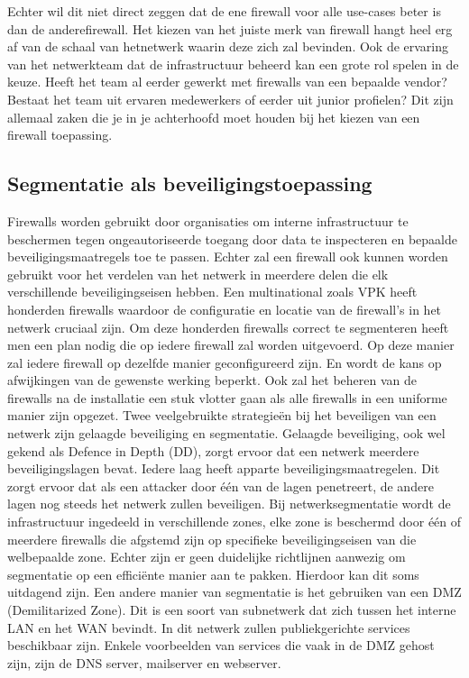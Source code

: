 Echter wil dit niet direct zeggen dat de ene firewall voor alle use-cases beter is dan de anderefirewall. Het kiezen van het juiste merk van firewall hangt heel erg af van de schaal van hetnetwerk waarin deze zich zal bevinden. Ook de ervaring van het netwerkteam dat de infrastructuur beheerd kan een grote rol spelen in de keuze. Heeft het team al eerder gewerkt met firewalls van een bepaalde vendor? Bestaat het team uit ervaren medewerkers of eerder uit junior profielen? Dit zijn allemaal zaken die je in je achterhoofd moet houden bij het kiezen van een firewall toepassing.



\subsection{Segmentatie als beveiligingstoepassing}
Firewalls worden gebruikt door organisaties om interne infrastructuur te beschermen tegen ongeautoriseerde toegang door data te inspecteren en bepaalde beveiligingsmaatregels toe te passen. Echter zal een firewall ook kunnen worden gebruikt voor het verdelen van het netwerk in meerdere delen die elk verschillende beveiligingseisen hebben. Een multinational zoals VPK heeft honderden firewalls waardoor de configuratie en locatie van de firewall’s in het netwerk cruciaal zijn. Om deze honderden firewalls correct te segmenteren heeft men een plan nodig die op iedere firewall zal worden uitgevoerd. Op deze manier zal iedere firewall op dezelfde manier geconfigureerd zijn. En wordt de kans op afwijkingen van de gewenste werking beperkt. Ook zal het beheren van de firewalls na de installatie een stuk vlotter gaan als alle firewalls in een uniforme manier zijn opgezet.
Twee veelgebruikte strategieën bij het beveiligen van een netwerk zijn gelaagde beveiliging en segmentatie. Gelaagde beveiliging, ook wel gekend als Defence in Depth (DD), zorgt ervoor dat een netwerk meerdere beveiligingslagen bevat. Iedere laag heeft apparte beveiligingsmaatregelen. Dit zorgt ervoor dat als een attacker door één van de lagen penetreert, de andere lagen nog steeds het netwerk zullen beveiligen. \autocite{FortinetDE2025} Bij netwerksegmentatie wordt de infrastructuur ingedeeld in verschillende zones, elke zone is beschermd door één of meerdere firewalls die afgstemd zijn op specifieke beveiligingseisen van die welbepaalde zone. Echter zijn er geen duidelijke richtlijnen aanwezig om segmentatie op een efficiënte manier aan te pakken. Hierdoor kan dit soms uitdagend zijn. \autocite{Mhaskar2021}
Een andere manier van segmentatie is het gebruiken van een DMZ (Demilitarized Zone). Dit is een soort van subnetwerk dat zich tussen het interne LAN en het WAN bevindt. In dit netwerk zullen publiekgerichte services beschikbaar zijn. Enkele voorbeelden van services die vaak in de DMZ gehost zijn, zijn de DNS server, mailserver en webserver. \autocite{Patel2020}



